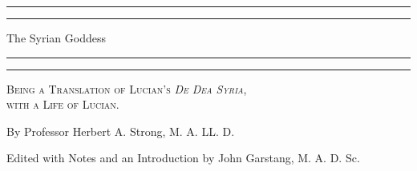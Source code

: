 \documentclass[a4paper, 11pt, oneside, polutonikogreek, english]{article}
\begin{document}
\begin{titlepage} %
	\centering %
	\scshape %

	
	\rule{\textwidth}{1.6pt}\vspace*{-\baselineskip}\vspace*{2pt} %
	\rule{\textwidth}{0.4pt} %
	
	\vspace{0.75\baselineskip} %

        {\Huge The Syrian Goddess \\} %
	
	\vspace{0.75\baselineskip} %
	
	\rule{\textwidth}{0.4pt}\vspace*{-\baselineskip}\vspace{3.2pt} %
	\rule{\textwidth}{1.6pt} %
	
	\vspace{1\baselineskip} %
	

        {\scshape\Large Being a Translation of Lucian's \emph{De Dea Syria},\\with a Life of Lucian.}
 
	\vspace*{1\baselineskip} %
	
	
	\vspace{1\baselineskip} %

        {By Professor Herbert A. Strong, M. A. LL. D.}

        \vspace{1\baselineskip} %

        {\small Edited with Notes and an Introduction by John Garstang, M. A. D. Sc.}


\end{titlepage}
\end{document}
